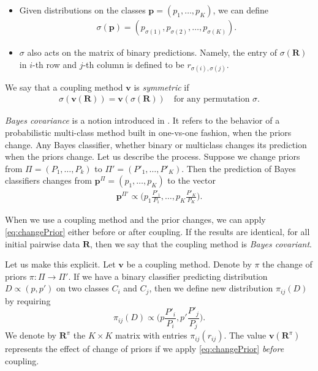 \begin{itemize}
	\item Given  distributions on the classes $\boldsymbol{p}= (p_1, \ldots, p_K)$, we can define
	\begin{align}
		\sigma(\boldsymbol{p})= (p_{\sigma(1)},p_{\sigma(2)}, \ldots, p_{\sigma(K)}).
	\end{align}
	 \item $\sigma$ also acts on the matrix of binary predictions. Namely, the entry of $\sigma(\boldsymbol{R})$ in $i$-th row and $j$-th column is defined to be $r_{\sigma(i), \sigma(j)}$.
	 \end{itemize}
We say that a coupling method $\boldsymbol{v}$ is \emph{symmetric} if 
\begin{align}
		\sigma(\boldsymbol{v}(\boldsymbol{R})) = \boldsymbol{v}(\sigma(\boldsymbol{R}))\quad\textrm{for any permutation $\sigma$}.
\end{align}

\emph{Bayes covariance} is a notion introduced in  \cite{vsuch2016bayes}. It refers to the behavior of a probabilistic multi-class method built in one-vs-one fashion, when the priors change. Any Bayes classifier, whether binary or multiclass changes its prediction when the priors change. Let us describe the process. Suppose we change priors from $\Pi = (P_1, \ldots, P_k)$ to $\Pi'= (P'_1, \ldots, P'_K)$. Then the prediction of Bayes classifiers changes from $\boldsymbol{p}^\Pi= (p_1, \ldots, p_K)$ to the vector 
\begin{align}
\boldsymbol{p}^{\Pi'} \propto \biggl(p_1 \frac{P'_1}{P_1}, \ldots, p_K \frac{P'_K}{P_K}\biggr). \label{eq:changePrior}
\end{align}

When we use a coupling method and the prior changes, we  can apply \eqref{eq:changePrior} either before or after coupling. If the results are identical, for all initial pairwise data $\boldsymbol{R}$, then we say that the coupling method is \emph{Bayes covariant}. 

Let us make this explicit. Let $\boldsymbol{v}$ be a coupling method. Denote by  $\pi$ the change of priors $\pi:\Pi \rightarrow \Pi'$. If we have a  binary classifier predicting distribution $D \propto (p, p')$ on two classes $C_i$ and $C_j$, then we define new distribution $\pi_{ij}(D)$ by requiring
$$
\pi_{ij}(D) \propto \biggl(p \frac{P'_i}{P_i},p' \frac{P'_j}{P_j}\biggr).
$$
We denote by $\boldsymbol{R}^\pi$ the $K\times K$ matrix with entries $\pi_{ij}(r_{ij})$. The value $\boldsymbol{v}(\boldsymbol{R}^\pi)$ represents the effect of change of priors if we apply \eqref{eq:changePrior} \emph{before} coupling.


